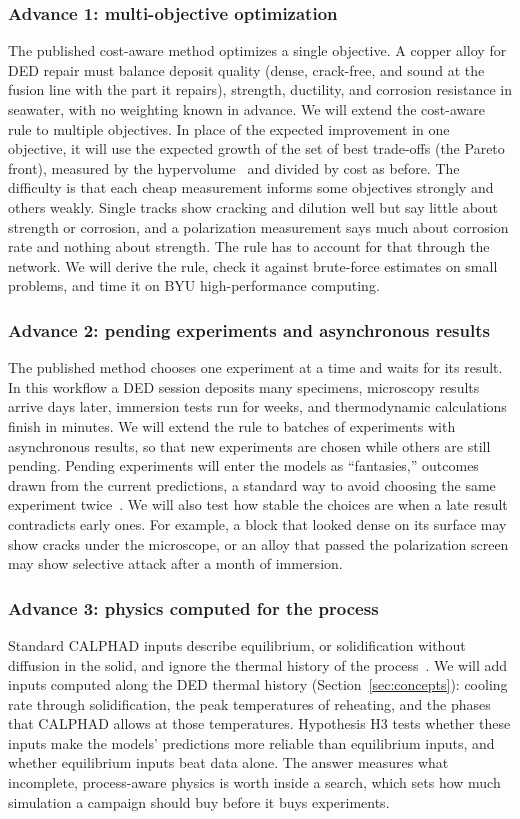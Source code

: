 \documentclass[12pt,letterpaper]{article}
\begin{document}
\subsubsection{Advance 1: multi-objective optimization}
The published cost-aware method optimizes a single objective. A copper alloy
for DED repair must balance deposit quality (dense, crack-free, and sound at
the fusion line with the part it repairs), strength, ductility, and corrosion
resistance in seawater, with no weighting known in advance. We will extend
the cost-aware rule to multiple objectives. In place of the expected
improvement in one objective, it will use the expected growth of the set of
best trade-offs (the Pareto front), measured by the
hypervolume~\cite{daulton2021} and divided by cost as before.
The difficulty is that each cheap measurement informs some objectives strongly
and others weakly. Single tracks show cracking and dilution well but say
little about strength or corrosion, and a polarization measurement says much
about corrosion rate and nothing about strength. The rule has to account for
that through the network. We will derive the rule, check it against
brute-force estimates on small problems, and time it on
BYU high-performance computing.

\subsubsection{Advance 2: pending experiments and asynchronous results}
The published method chooses one experiment at a time and waits for its
result. In this workflow a DED session deposits many specimens, microscopy
results arrive days later, immersion tests run for weeks, and thermodynamic
calculations finish in minutes. We will extend the rule to batches of experiments
with asynchronous results, so that new experiments are chosen while others
are still pending. Pending experiments will enter the models as
``fantasies,'' outcomes drawn from the current predictions, a standard way to
avoid choosing the same experiment twice~\cite{snoek2012}. We will also test how
stable the choices are when a late result contradicts early ones. For
example, a block that looked dense on its surface may show cracks under the
microscope, or an alloy that passed the polarization screen may show
selective attack after a month of immersion.

\subsubsection{Advance 3: physics computed for the process}
Standard CALPHAD inputs describe equilibrium, or solidification without
diffusion in the solid, and ignore the thermal history of the
process~\cite{debroy2018}. We will add inputs computed along the DED thermal
history (Section~\ref{sec:concepts}): cooling rate through solidification, the peak
temperatures of reheating, and the phases that CALPHAD allows at those
temperatures. Hypothesis H3 tests whether these inputs make the models'
predictions more reliable than equilibrium inputs, and whether equilibrium
inputs beat data alone. The answer measures what incomplete, process-aware
physics is worth inside a search, which sets how much simulation a campaign
should buy before it buys experiments.
\end{document}
